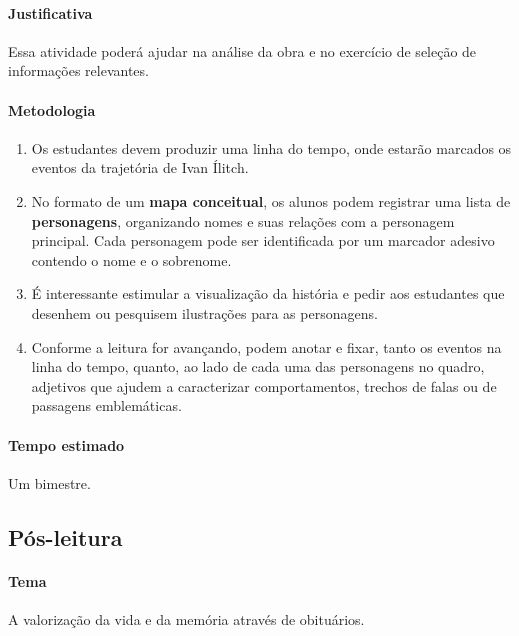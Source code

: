 \documentclass[12pt]{extarticle}
\begin{document}
\paragraph{Justificativa} Essa atividade poderá ajudar na análise 
da obra e no exercício de seleção de informações relevantes.

\paragraph{Metodologia}

\begin{enumerate}

\item Os estudantes devem produzir uma linha do
tempo, onde estarão marcados os eventos da trajetória de Ivan Ílitch.

\item No formato de um \textbf{mapa conceitual}, os alunos podem 
registrar uma lista de \textbf{personagens}, organizando nomes e suas
relações com a personagem principal. Cada personagem pode ser
identificada por um marcador adesivo contendo o nome e o sobrenome.

\item É interessante estimular a visualização da história e pedir aos estudantes
que desenhem ou pesquisem ilustrações para as personagens.

\item Conforme a leitura for avançando, podem anotar e fixar, tanto os eventos na linha do
tempo, quanto, ao lado de cada uma das personagens no quadro, adjetivos
que ajudem a caracterizar comportamentos, trechos de falas ou de
passagens emblemáticas.

\end{enumerate}

\paragraph{Tempo estimado} Um bimestre.


\subsection{Pós-leitura}




\paragraph{Tema} A valorização da vida e da memória através de obituários.
\end{document}
